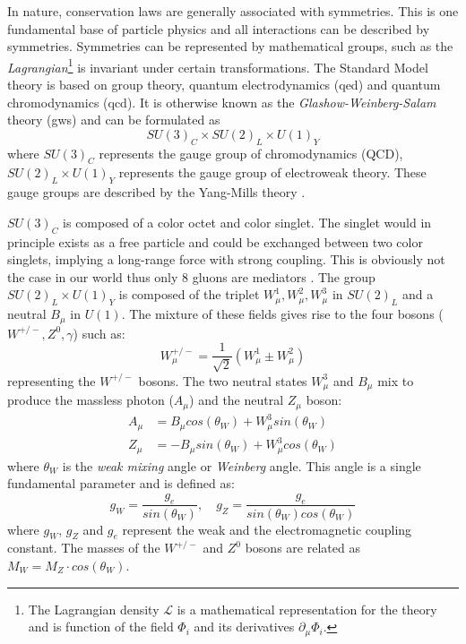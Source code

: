 In nature, conservation laws are generally associated with symmetries. This is one fundamental base of particle physics and all interactions can be described by symmetries. Symmetries can be represented by mathematical groups, such as the \textit{Lagrangian}\footnote{The Lagrangian density $\mathcal{L}$ is a mathematical representation for the theory and is function of the field $\Phi_i$ and its derivatives $\partial_{\mu}\Phi_i$.} is invariant under certain transformations. The Standard Model theory is based on group theory, quantum electrodynamics (\acrshort{qed}) and quantum chromodynamics (\acrshort{qcd}). It is otherwise known as the \textit{Glashow-Weinberg-Salam} theory (\acrshort{gws}) and can be formulated as
\begin{equation}
  SU(3)_{C} \times SU(2)_{L} \times U(1)_{Y}
\end{equation}
where $SU(3)_{C}$ represents the gauge group of chromodynamics (QCD), $SU(2)_{L} \times U(1)_{Y}$ represents the gauge group of electroweak theory. These gauge groups are described by the Yang-Mills theory \cite{Yang:1954ek}.

$SU(3)_{C}$ is composed of a color octet and color singlet. The singlet would in principle exists as a free particle and could be exchanged between two color singlets, implying a long-range force with strong coupling. This is obviously not the case in our world thus only 8 gluons are mediators \cite{Griffiths:343277}. The group $SU(2)_{L} \times U(1)_{Y}$ is composed of the triplet $W_{\mu}^1, W_{\mu}^2, W_{\mu}^3$ in $SU(2)_{L}$ and a neutral $B_{\mu}$ in $U(1)$. The mixture of these fields gives rise to the four bosons ($W^{+/-}, Z^0, \gamma$) such as:
\begin{equation}
  W_{\mu}^{+/-} = \frac{1}{\sqrt{2}}(W_{\mu}^1 \pm W_{\mu}^2)
\end{equation}
representing the $W^{+/-}$ bosons. The two neutral states $W_{\mu}^3$ and $B_{\mu}$ mix to produce the massless photon ($A_{\mu}$) and the neutral $Z_{\mu}$ boson:
\begin{equation}
  \begin{aligned}
    A_{\mu} &= B_{\mu} cos(\theta_W) + W_{\mu}^3 sin(\theta_W)\\
    Z_{\mu} &= - B_{\mu} sin(\theta_W) + W_{\mu}^3 cos(\theta_W)
  \end{aligned}
\end{equation}
where $\theta_W$ is the \textit{weak mixing} angle or \textit{Weinberg} angle. This angle is a single fundamental parameter and is defined as:
\begin{equation}
  g_W = \frac{g_e}{sin(\theta_W)}, \quad g_Z = \frac{g_e}{sin(\theta_W) cos(\theta_W)}
\end{equation}
where $g_W$, $g_Z$ and $g_e$ represent the weak and the electromagnetic coupling constant. The masses of the $W^{+/-}$ and $Z^0$ bosons are related as $M_W = M_Z \cdot cos(\theta_W)$.

